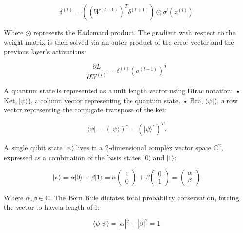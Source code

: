 \documentclass[12pt]{article}
\begin{document}
\begin{equation}
\delta ^{(l)}=\left((W^{(l+1)})^{T}\delta ^{(l+1)}\right)\odot \sigma ^{\prime }\left(z^{(l)}\right) \tag{24}
\end{equation}
\vspace{0.1cm}

Where $\odot$ represents the Hadamard product. The gradient with respect to the weight matrix is then solved via an outer product of the error vector and the previous layer's activations:

\begin{equation}
\frac{\partial L}{\partial W^{(l)}}=\delta ^{(l)}(a^{(l-1)})^{T} \tag{25}
\end{equation}
 \vspace{0.1cm}

A quantum state is represented as a unit length vector using Dirac notation:
• Ket, $\vert\psi\rangle$), a column vector representing the quantum state.
• Bra, $\langle\psi\vert$), a row vector representing the conjugate transpose of the ket: 

\begin{equation}
\langle\psi\vert = (\vert\psi\rangle)^\dagger = (\vert\psi\rangle^*)^T. \tag{26}
\end{equation}
\vspace{0.1cm}

A single qubit state $\vert\psi\rangle$ lives in a 2-dimensional complex vector space $\mathbb{C}^{2}$, expressed as a combination of the basis states $\vert{}0\rangle$ and $\vert{}1\rangle$:

\begin{equation}
|\psi \rangle =\alpha |0\rangle +\beta |1\rangle =\alpha \begin{pmatrix}1\\ 0\end{pmatrix}+\beta \begin{pmatrix}0\\ 1\end{pmatrix}=\begin{pmatrix}\alpha \\ \beta \end{pmatrix} \tag{27}
\end{equation}
\vspace{0.1cm}

Where $\alpha, \beta \in \mathbb{C}$. The Born Rule dictates total probability conservation, forcing the vector to have a length of 1:

\begin{equation}
\langle \psi |\psi \rangle =|\alpha |^{2}+|\beta |^{2}=1 \tag{28}
\end{equation}
\vspace{0.1cm}
\end{document}
